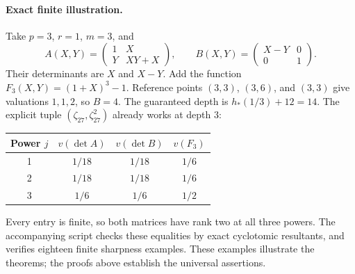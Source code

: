 \paragraph{Exact finite illustration.}
Take $p=3$, $r=1$, $m=3$, and
\[
 A(X,Y)=\begin{pmatrix}1&X\\Y&XY+X\end{pmatrix},\qquad
 B(X,Y)=\begin{pmatrix}X-Y&0\\0&1\end{pmatrix}.
\]
Their determinants are $X$ and $X-Y$. Add the function
$F_3(X,Y)=(1+X)^3-1$. Reference points $(3,3)$, $(3,6)$, and $(3,3)$
give valuations $1,1,2$, so $B=4$. The guaranteed depth is
$h_*(1/3)+12=14$. The explicit tuple
$(\zeta_{27},\zeta_{27}^2)$ already works at depth $3$:
\begin{center}
\begin{tabular}{cccc}
\toprule
Power $j$ & $v(\det A)$ & $v(\det B)$ & $v(F_3)$\\
\midrule
1 & $1/18$ & $1/18$ & $1/6$\\
2 & $1/18$ & $1/18$ & $1/6$\\
3 & $1/6$ & $1/6$ & $1/2$\\
\bottomrule
\end{tabular}
\end{center}
Every entry is finite, so both matrices have rank two at all three powers.
The accompanying script checks these equalities by exact cyclotomic
resultants, and verifies eighteen finite sharpness examples. These examples
illustrate the theorems; the proofs above establish the universal assertions.
